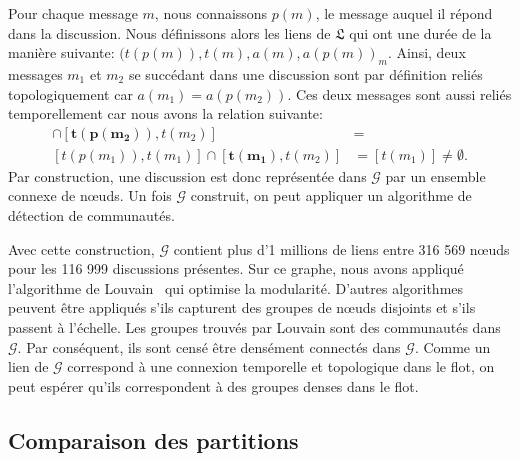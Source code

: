 Pour chaque message $m$, nous connaissons $p(m)$, le message auquel il répond dans la discussion.
Nous définissons alors les liens de $\mathfrak{L}$ qui ont une durée de la manière suivante: ${(t(p(m)),t(m),a(m),a(p(m))}_m$.
Ainsi, deux messages $m_1$ et $m_2$ se succédant dans une discussion sont par définition reliés topologiquement car $a(m_1)= a(p(m_2))$.
Ces deux messages sont aussi reliés temporellement car  nous avons la relation suivante:
\begin{align*}
[t(p(m_1)),t(m_1)]\cap [\mathbf{t(p(m_2))},t(m_2)] &= \\
[t(p(m_1)),t(m_1)]\cap [\mathbf{t(m_1)},t(m_2)] &= [t(m_1)] \neq \emptyset.
\end{align*}
Par construction, une discussion est donc représentée dans $\mathcal{G}$ par un ensemble connexe de n\oe{}uds.
Un fois $\mathcal{G}$ construit, on peut appliquer un algorithme de détection de communautés.

Avec cette construction, $\mathcal{G}$ contient plus d'1 millions de liens entre 316 569 n\oe{}uds pour les 116 999 discussions présentes.
Sur ce graphe, nous avons appliqué l'algorithme de Louvain~\cite{Blondel2008a} qui optimise la modularité.
D'autres algorithmes peuvent être appliqués s'ils capturent des groupes de n\oe{}uds disjoints et s'ils passent à l'échelle.
Les groupes trouvés par Louvain sont des communautés dans $\mathcal{G}$.
Par conséquent, ils sont censé être densément connectés dans $\mathcal{G}$.
Comme un lien de $\mathcal{G}$ correspond à une connexion temporelle et topologique dans le flot, on peut espérer qu'ils correspondent à des groupes denses dans le flot.

\subsection{Comparaison des partitions}

